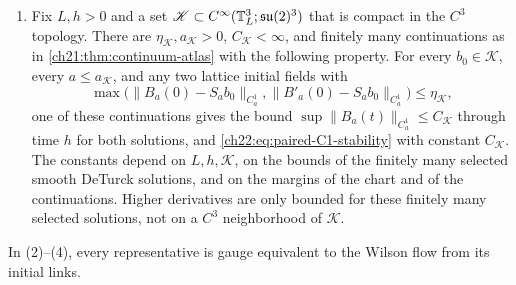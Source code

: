 \begin{lemma}
\begin{enumerate}
\item Fix $L,h>0$ and a set $\mathscr K\subset C^\infty(\mathbb T_L^3;\mathfrak{su}(2)^3)$ that is compact in the $C^3$ topology. There are $\eta_{\mathscr K},a_{\mathscr K}>0$, $C_{\mathscr K}<\infty$, and finitely many continuations as in \cref{ch21:thm:continuum-atlas} with the following property. For every $b_0\in\mathscr K$, every $a\le a_{\mathscr K}$, and any two lattice initial fields with
\[
 \max\bigl(\|B_a(0)-S_ab_0\|_{C_a^1},\|B'_a(0)-S_ab_0\|_{C_a^1}\bigr)\le\eta_{\mathscr K},
\]
one of these continuations gives the bound $\sup\|B_a(t)\|_{C^1_a}\le C_{\mathscr K}$ through time $h$ for both solutions, and \eqref{ch22:eq:paired-C1-stability} with constant $C_{\mathscr K}$. The constants depend on $L,h,\mathscr K$, on the bounds of the finitely many selected smooth DeTurck solutions, and on the margins of the chart and of the continuations. Higher derivatives are only bounded for these finitely many selected solutions, not on a $C^3$ neighborhood of $\mathscr K$.
\end{enumerate}
In (2)--(4), every representative is gauge equivalent to the Wilson flow from its initial links.
\end{lemma}

